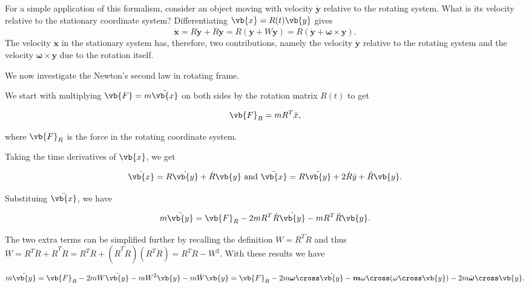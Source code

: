 \documentclass[a4paper,12pt]{report}
\begin{document}
For a simple application of this formalism, consider an object moving with velocity \(\dot{\mathbf{y}}\) relative to the rotating system. What is its velocity relative to the stationary coordinate system? Differentiating \(\vb{x} = R(t)\vb{y} \)  gives
\begin{equation}
\dot{\mathbf{x}} = R \dot{\mathbf{y}} + \dot{R} \mathbf{y} = R (\dot{\mathbf{y}} + W \mathbf{y}) = R (\dot{\mathbf{y}} + \boldsymbol{\omega} \times \mathbf{y}) .
\end{equation}
The velocity \(\dot{\mathbf{x}}\) in the stationary system has, therefore, two contributions, namely the velocity \(\dot{\mathbf{y}}\) relative to the rotating system and the velocity \(\boldsymbol{\omega} \times \mathbf{y}\) due to the rotation itself.

We now investigate the Newton's second law in rotating frame.

We start with multiplying \(\vb{F} = m \ddot{\vb{x} } \) on both sides by the rotation matrix \(R(t)\) to get

\begin{equation}
    \vb{F} _{R} = mR^{T}\ddot{x},   
\end{equation}

where \(\vb{F} _{R} \) is the force in the rotating coordinate system.

Taking the time derivatives of \(\vb{x} \), we get 

\begin{equation}
    \dot{\vb{x} } = R \dot{\vb{y} } + \dot{R} \vb{y} \text { and } \ddot{\vb{x} } = R \ddot{\vb{y} } + 2\dot{R} \dot{y} + \ddot{R} \vb{y} .   
\end{equation}

Substituing \(\ddot{\vb{x} } \), we have

\begin{equation}
    m \ddot{\vb{y} } = \vb{F} _{R} - 2mR^{T}\dot{R} \dot{\vb{y} } - mR^{T} \ddot{R} \vb{y} .      
\end{equation}

The two extra terms can be simplified further by recalling the definition \(W = R^{T}\dot{R}  \) and thus \(\dot{W} = R^{T} \ddot{R} + \dot{R} ^{T} \dot{R} = R^{T}\ddot{R} + (\dot{R} ^{T}R )(R^{T}\dot{R}  ) = R^{T}\ddot{R} - W^2      \). With these results we have

\begin{equation}
    m \ddot{\vb{y} }  = \vb{F} _{R} - 2mW \dot{\vb{y} } - mW^2 \vb{y}  - m \dot{W} \vb{y} = \vb{F} _{R} - 2m \boldsymbol{\omega }\cross \dot{\vb{y} } - \boldsymbol{m} \omega \cross (\omega \cross \vb{y} ) - 2m \dot{\boldsymbol{\omega } }\cross \vb{y} .       
\end{equation}
\end{document}
